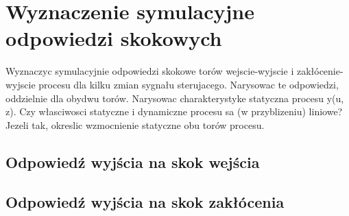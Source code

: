 \section{Wyznaczenie symulacyjne odpowiedzi skokowych}

Wyznaczyc symulacyjnie odpowiedzi skokowe torów wejscie-wyjscie i zakłócenie-wyjscie
procesu dla kilku zmian sygnału sterujacego. Narysowac te odpowiedzi, oddzielnie dla
obydwu torów. Narysowac charakterystyke statyczna procesu y(u, z). Czy własciwosci
statyczne i dynamiczne procesu sa (w przyblizeniu) liniowe? Jezeli tak, okreslic
wzmocnienie statyczne obu torów procesu.

\subsection{Odpowiedź wyjścia na skok wejścia}

\subsection{Odpowiedź wyjścia na skok zakłócenia}
